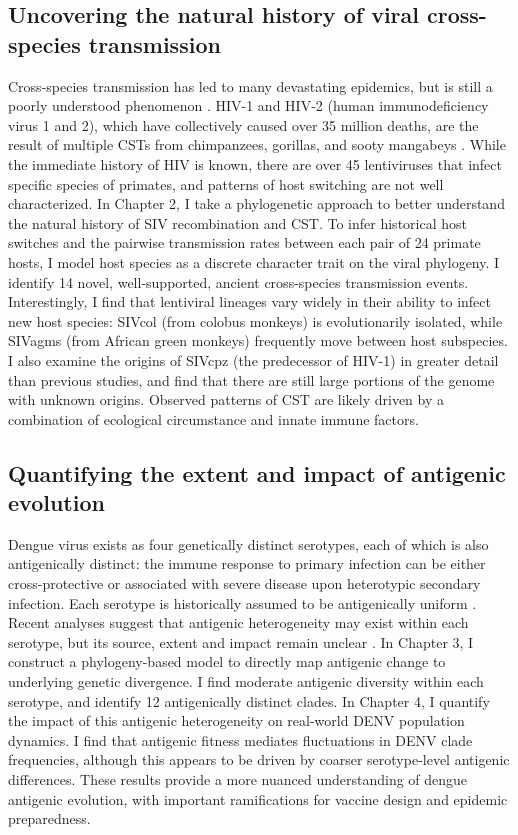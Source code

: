 \subsection{Uncovering the natural history of viral cross-species transmission}
Cross-species transmission has led to many devastating epidemics, but is still a poorly understood phenomenon \citep{parrish2008cross}.
HIV-1 and HIV-2 (human immunodeficiency virus 1 and 2), which have collectively caused over 35 million deaths, are the result of multiple CSTs from chimpanzees, gorillas, and sooty mangabeys \citep{sharp2011origins}.
While the immediate history of HIV is known, there are over 45 lentiviruses that infect specific species of primates, and patterns of host switching are not well characterized.
In Chapter 2, I take a phylogenetic approach to better understand the natural history of SIV recombination and CST.
To infer historical host switches and the pairwise transmission rates between each pair of 24 primate hosts, I model host species as a discrete character trait on the viral phylogeny.
I identify 14 novel, well-supported, ancient cross-species transmission events.
Interestingly, I find that lentiviral lineages vary widely in their ability to infect new host species: SIVcol (from colobus monkeys) is evolutionarily isolated, while SIVagms (from African green monkeys) frequently move between host subspecies.
I also examine the origins of SIVcpz (the predecessor of HIV-1) in greater detail than previous studies, and find that there are still large portions of the genome with unknown origins.
Observed patterns of CST are likely driven by a combination of ecological circumstance and innate immune factors.

\subsection{Quantifying the extent and impact of antigenic evolution}
Dengue virus exists as four genetically distinct serotypes, each of which is also antigenically distinct: the immune response to primary infection can be either cross-protective or associated with severe disease upon heterotypic secondary infection.
Each serotype is historically assumed to be antigenically uniform \citep{twiddy2003inferring}.
Recent analyses suggest that antigenic heterogeneity may exist within each serotype, but its source, extent and impact remain unclear \citep{katzelnick2015dengue}.
In Chapter 3, I construct a phylogeny-based model to directly map antigenic change to underlying genetic divergence.
I find moderate antigenic diversity within each serotype, and identify 12 antigenically distinct clades.
In Chapter 4, I quantify the impact of this antigenic heterogeneity on real-world DENV population dynamics.
I find that antigenic fitness mediates fluctuations in DENV clade frequencies, although this appears to be driven by coarser serotype-level antigenic differences.
These results provide a more nuanced understanding of dengue antigenic evolution, with important ramifications for vaccine design and epidemic preparedness.

